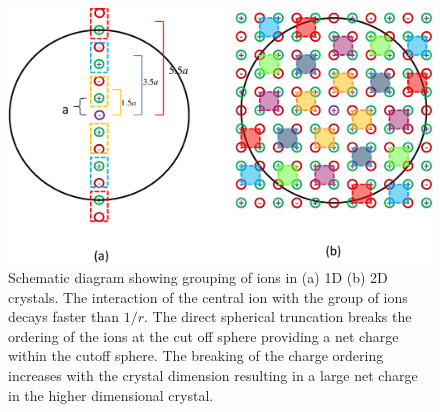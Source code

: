\begin{figure}
  \centering
  \includegraphics[width=\linewidth]{1D_2DCrystal.pdf}
  \caption{Schematic diagram showing grouping of ions in (a) 1D (b) 2D crystals. The interaction of the central ion with the group of ions decays faster than $1/r$. The direct spherical truncation breaks the ordering of the ions at the cut off sphere providing a net charge within the cutoff sphere. The breaking of the charge ordering increases with the crystal dimension resulting in a large net charge in the higher dimensional crystal.}
   \label{fig:schematic}
\end{figure}

